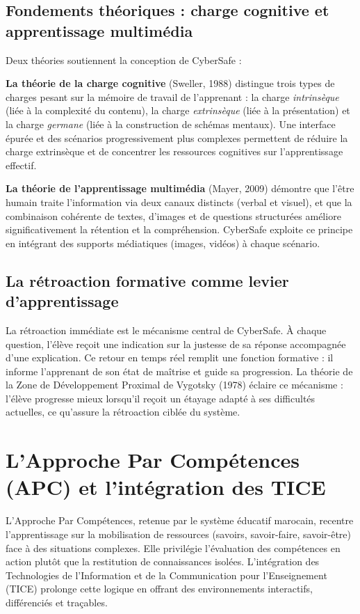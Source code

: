 \documentclass[12pt, a4paper, oneside]{report}
\begin{document}
\subsection{Fondements théoriques : charge cognitive et apprentissage multimédia}
Deux théories soutiennent la conception de CyberSafe :

\textbf{La théorie de la charge cognitive} (Sweller, 1988) distingue trois types de charges pesant sur la mémoire de travail de l'apprenant : la charge \textit{intrinsèque} (liée à la complexité du contenu), la charge \textit{extrinsèque} (liée à la présentation) et la charge \textit{germane} (liée à la construction de schémas mentaux). Une interface épurée et des scénarios progressivement plus complexes permettent de réduire la charge extrinsèque et de concentrer les ressources cognitives sur l'apprentissage effectif.

\textbf{La théorie de l'apprentissage multimédia} (Mayer, 2009) démontre que l'être humain traite l'information via deux canaux distincts (verbal et visuel), et que la combinaison cohérente de textes, d'images et de questions structurées améliore significativement la rétention et la compréhension. CyberSafe exploite ce principe en intégrant des supports médiatiques (images, vidéos) à chaque scénario.

\subsection{La rétroaction formative comme levier d'apprentissage}
La rétroaction immédiate est le mécanisme central de CyberSafe. À chaque question, l'élève reçoit une indication sur la justesse de sa réponse accompagnée d'une explication. Ce retour en temps réel remplit une fonction formative : il informe l'apprenant de son état de maîtrise et guide sa progression. La théorie de la Zone de Développement Proximal de Vygotsky (1978) éclaire ce mécanisme : l'élève progresse mieux lorsqu'il reçoit un étayage adapté à ses difficultés actuelles, ce qu'assure la rétroaction ciblée du système.

\section{L'Approche Par Compétences (APC) et l'intégration des TICE}
L'Approche Par Compétences, retenue par le système éducatif marocain, recentre l'apprentissage sur la mobilisation de ressources (savoirs, savoir-faire, savoir-être) face à des situations complexes. Elle privilégie l'évaluation des compétences en action plutôt que la restitution de connaissances isolées. L'intégration des Technologies de l'Information et de la Communication pour l'Enseignement (TICE) prolonge cette logique en offrant des environnements interactifs, différenciés et traçables.
\end{document}
